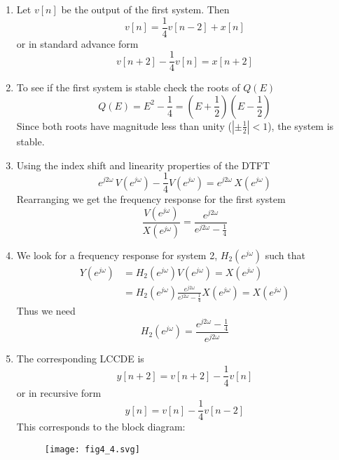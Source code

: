 \documentclass{article}
\begin{document}
\begin{enumerate}
\item Let $v[n]$ be the output of the first system. Then
  \[
  v[n] = \frac{1}{4} v[n-2] + x[n]
  \]
  or in standard advance form
  \[
  v[n+2] - \frac{1}{4} v[n] = x[n+2]
  \]

\item To see if the first system is stable check the roots of $Q(E)$
  \[
  Q(E) = E^2 - \frac{1}{4} = \left(E + \frac{1}{2}\right)\left(E - \frac{1}{2}\right)
  \]
  Since both roots have magnitude less than unity ($|\pm \frac{1}{2}| < 1$), the system is stable.

\item Using the index shift and linearity properties of the DTFT
  \[
  e^{j2\omega}\, V\left( e^{j\omega} \right) - \frac{1}{4} V\left( e^{j\omega} \right) = e^{j2\omega}\, X\left( e^{j\omega} \right)
  \]
  Rearranging we get the frequency response for the first system
  \[
  \frac{V\left( e^{j\omega} \right)}{X\left( e^{j\omega} \right)} = \frac{e^{j2\omega}}{e^{j2\omega}-\frac{1}{4}}
  \]

\item We look for a frequency response for system 2, $H_2\left( e^{j\omega} \right)$ such that
  \begin{align}
    Y\left( e^{j\omega} \right) &= H_2\left( e^{j\omega} \right)V\left( e^{j\omega} \right) = X\left( e^{j\omega} \right)\\
    &= H_2\left( e^{j\omega} \right)\frac{e^{j2\omega}}{e^{j2\omega}-\frac{1}{4}}X\left( e^{j\omega} \right)  = X\left( e^{j\omega} \right)
  \end{align}
  Thus we need
  \[
  H_2\left( e^{j\omega} \right) = \frac{e^{j2\omega}-\frac{1}{4}}{e^{j2\omega}}
  \]

\item The corresponding LCCDE is
  \[
  y[n+2] = v[n+2] - \frac{1}{4} v[n]
  \]
  or in recursive form
  \[
  y[n] = v[n] - \frac{1}{4}v[n-2]
  \]
  This corresponds to the block diagram:
  \begin{figure}
  \centering
  \texttt{[image: fig4\_4.svg]}
  \end{figure}
  
\end{enumerate}
\end{document}

